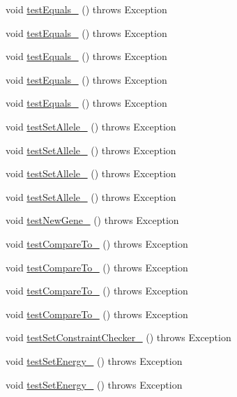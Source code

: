 \begin{DoxyCompactItemize}
\item 
void \hyperlink{classorg_1_1jgap_1_1impl_1_1_number_gene_test_a2bebd7a31332e8dc7a37f2a756a10e23}{test\-Equals\-\_} ()  throws Exception 
\item 
void \hyperlink{classorg_1_1jgap_1_1impl_1_1_number_gene_test_a9afcb0bd88f1372841f9e378d4b03bef}{test\-Equals\-\_} ()  throws Exception 
\item 
void \hyperlink{classorg_1_1jgap_1_1impl_1_1_number_gene_test_acd8f4db4e78592f2a5e6b3dd75bedbe1}{test\-Equals\-\_} ()  throws Exception 
\item 
void \hyperlink{classorg_1_1jgap_1_1impl_1_1_number_gene_test_a205973b862760df74abe53cf88702225}{test\-Equals\-\_} ()  throws Exception 
\item 
void \hyperlink{classorg_1_1jgap_1_1impl_1_1_number_gene_test_af0028323d96c252698113ac2595a4f15}{test\-Equals\-\_} ()  throws Exception 
\item 
void \hyperlink{classorg_1_1jgap_1_1impl_1_1_number_gene_test_a9ce46f90656b4de42de35d02c69a361d}{test\-Set\-Allele\-\_} ()  throws Exception 
\item 
void \hyperlink{classorg_1_1jgap_1_1impl_1_1_number_gene_test_a06160100430df7fa8b1a40e79a5e8e8b}{test\-Set\-Allele\-\_} ()  throws Exception 
\item 
void \hyperlink{classorg_1_1jgap_1_1impl_1_1_number_gene_test_af9cd7b696d6739d77269b1d1e17f4841}{test\-Set\-Allele\-\_} ()  throws Exception 
\item 
void \hyperlink{classorg_1_1jgap_1_1impl_1_1_number_gene_test_ae26dca10bced622919f21e82da9ef300}{test\-Set\-Allele\-\_} ()  throws Exception 
\item 
void \hyperlink{classorg_1_1jgap_1_1impl_1_1_number_gene_test_afb77fc2c76c29302ee97efaed3f2b016}{test\-New\-Gene\-\_} ()  throws Exception 
\item 
void \hyperlink{classorg_1_1jgap_1_1impl_1_1_number_gene_test_a4fe99fcf0af709bc21fb8608363c5ced}{test\-Compare\-To\-\_} ()  throws Exception 
\item 
void \hyperlink{classorg_1_1jgap_1_1impl_1_1_number_gene_test_ada10341d9842ffe8d24e93edf81e8539}{test\-Compare\-To\-\_} ()  throws Exception 
\item 
void \hyperlink{classorg_1_1jgap_1_1impl_1_1_number_gene_test_afa64b98b0fd814cf38a7e748cc30f0bc}{test\-Compare\-To\-\_} ()  throws Exception 
\item 
void \hyperlink{classorg_1_1jgap_1_1impl_1_1_number_gene_test_ac94997977e3b16f8a41d68ad263d1402}{test\-Compare\-To\-\_} ()  throws Exception 
\item 
void \hyperlink{classorg_1_1jgap_1_1impl_1_1_number_gene_test_a789e68149276a16a7be7886c377fe0c0}{test\-Set\-Constraint\-Checker\-\_} ()  throws Exception 
\item 
void \hyperlink{classorg_1_1jgap_1_1impl_1_1_number_gene_test_a4a2f68a7bb91c97ce77702fa83b163e5}{test\-Set\-Energy\-\_} ()  throws Exception 
\item 
void \hyperlink{classorg_1_1jgap_1_1impl_1_1_number_gene_test_a19a7060516f0120dbfad40e1455d11f2}{test\-Set\-Energy\-\_} ()  throws Exception 
\end{DoxyCompactItemize}
